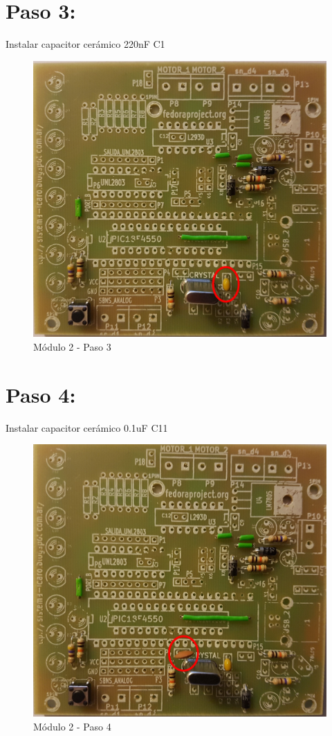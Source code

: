 \newpage

\section{Paso 3:}

Instalar capacitor cerámico 220nF C1 

\begin{figure}[h]
	\centering
	\includegraphics[width=0.8\linewidth]{Modulo_2/M2_3}
	\caption{Módulo 2 - Paso 3}
	\label{fig:M2_3}
\end{figure}

\newpage

\section{Paso 4:}

Instalar capacitor cerámico 0.1uF C11

\begin{figure}[h]
	\centering
	\includegraphics[width=0.8\linewidth]{Modulo_2/M2_4}
	\caption{Módulo 2 - Paso 4}
	\label{fig:M2_4}
\end{figure}

